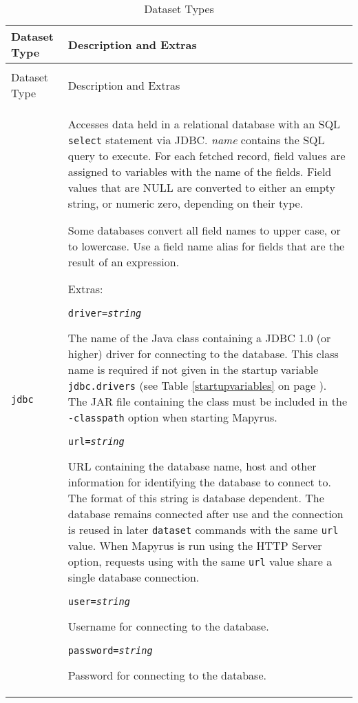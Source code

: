 \begin{longtable}{|p{3cm}|p{10cm}|}
\hline
\label{datasettypes}
Dataset Type & Description and Extras \\
\hline
\hline
\endfirsthead
\hline
\caption{Dataset Types} \\
\endfoot

\hline
Dataset Type & Description and Extras \\
\hline
\hline
\endhead

\texttt{jdbc} &
Accesses data held in a relational database with
an SQL \texttt{select} statement via JDBC.
\textit{name} contains the SQL query to execute.
For each fetched record, field values are assigned to variables
with the name of the fields.
Field values that are NULL are converted to either an empty string,
or numeric zero, depending on their type.

Some databases convert all field names to upper case, or to lowercase.
Use a field name alias for fields that are the result of an expression.

\vspace{10pt}
Extras:

\texttt{driver=\textit{string}}

The name of the Java class containing a JDBC 1.0 (or higher)
driver for connecting to the database.
This class name is required if not given in the startup variable
\texttt{jdbc.drivers} (see Table \ref{startupvariables}
on page \pageref{startupvariables}).
The JAR file containing the class must be included in the \texttt{-classpath}
option when starting Mapyrus.

\vspace{10pt}
\texttt{url=\textit{string}}

URL containing the database name, host and other information for identifying
the database to connect to.
The format of this string is database dependent.
The database remains connected after use and the connection is reused in later
\texttt{dataset} commands with the same \texttt{url} value.
When Mapyrus is run using the HTTP Server option,
requests using with the same \texttt{url} value share a
single database connection.

\vspace{10pt}
\texttt{user=\textit{string}}

Username for connecting to the database.

\vspace{10pt}
\texttt{password=\textit{string}}

Password for connecting to the database.


\end{longtable}
